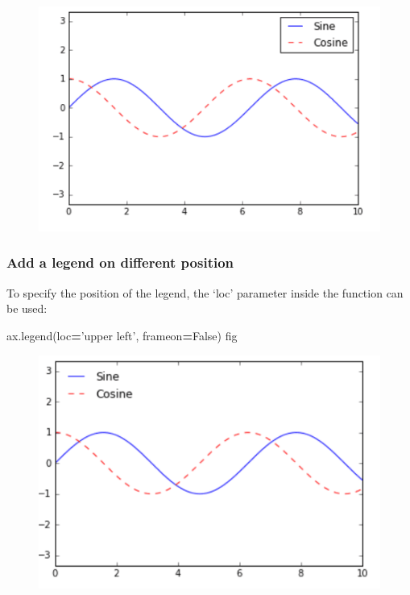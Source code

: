\documentclass[]{book}
\newenvironment{Shaded}{\begin{snugshade}}{\end{snugshade}}
\newcommand{\StringTok}[1]{\textcolor[rgb]{0.31,0.60,0.02}{#1}}
\newcommand{\VariableTok}[1]{\textcolor[rgb]{0.00,0.00,0.00}{#1}}
\newcommand{\OperatorTok}[1]{\textcolor[rgb]{0.81,0.36,0.00}{\textbf{#1}}}
\newcommand{\NormalTok}[1]{#1}
\theoremstyle{definition}
\theoremstyle{definition}
\theoremstyle{definition}
\theoremstyle{remark}
\begin{document}
\begin{figure}
\centering
\includegraphics{images/legend1.png}
\caption{}
\end{figure}

\subsubsection{Add a legend on different
position}\label{add-a-legend-on-different-position}

To specify the position of the legend, the `loc' parameter inside the
function can be used:

\begin{Shaded}
\begin{Highlighting}[]
\NormalTok{ax.legend(loc}\OperatorTok{=}\StringTok{'upper left'}\NormalTok{, frameon}\OperatorTok{=}\VariableTok{False}\NormalTok{)}
\NormalTok{fig}
\end{Highlighting}
\end{Shaded}

\begin{figure}
\centering
\includegraphics{images/legend2.png}
\caption{}
\end{figure}
\end{document}

